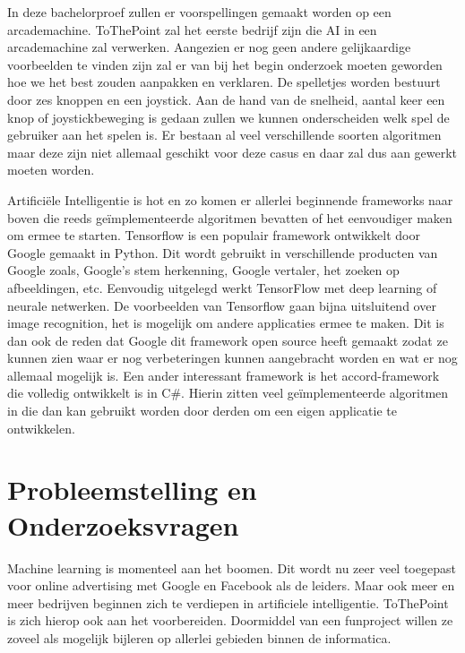 In deze bachelorproef zullen er voorspellingen gemaakt worden op een arcademachine. ToThePoint zal het eerste bedrijf zijn die AI in een arcademachine zal verwerken. Aangezien er nog geen andere gelijkaardige voorbeelden te vinden zijn zal er van bij het begin onderzoek moeten geworden hoe we het best zouden aanpakken en verklaren. De spelletjes worden bestuurt door zes knoppen en een joystick. Aan de hand van de snelheid, aantal keer een knop of joystickbeweging is gedaan zullen we kunnen onderscheiden welk spel de gebruiker aan het spelen is. Er bestaan al veel verschillende soorten algoritmen maar deze zijn niet allemaal geschikt voor deze casus en daar zal dus aan gewerkt moeten worden. 

Artificiële Intelligentie is hot en zo komen er allerlei beginnende frameworks naar boven die reeds geïmplementeerde algoritmen bevatten of het eenvoudiger maken om ermee te starten. 
Tensorflow is een populair framework ontwikkelt door Google gemaakt in Python. Dit wordt gebruikt in verschillende producten van Google zoals, Google's stem herkenning, Google vertaler, het zoeken op afbeeldingen, etc.
Eenvoudig uitgelegd werkt TensorFlow met deep learning of neurale netwerken. De voorbeelden van Tensorflow gaan bijna uitsluitend over image recognition, het is mogelijk om andere applicaties ermee te maken. Dit is dan ook de reden dat Google dit framework open source heeft gemaakt zodat ze kunnen zien waar er nog verbeteringen kunnen aangebracht worden en wat er nog allemaal mogelijk is.
Een ander interessant framework is het accord-framework die volledig ontwikkelt is in C\#. Hierin zitten veel geïmplementeerde algoritmen in die dan kan gebruikt worden door derden om een eigen applicatie te ontwikkelen. 



\section{Probleemstelling en Onderzoeksvragen}
\label{sec:onderzoeksvragen}


Machine learning is momenteel aan het boomen. Dit wordt nu zeer veel toegepast voor online advertising met Google en Facebook als de leiders. Maar ook meer en meer bedrijven beginnen zich te verdiepen in artificiele intelligentie. ToThePoint is zich hierop ook aan het voorbereiden. Doormiddel van een funproject willen ze zoveel als mogelijk bijleren op allerlei gebieden binnen de informatica. 

